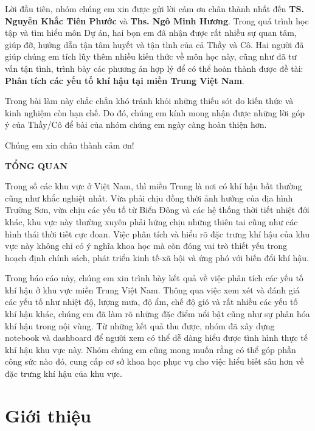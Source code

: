 \documentclass[12pt,a4paper]{article}
\begin{document}
Lời đầu tiên, nhóm chúng em xin được gửi lời cảm ơn chân thành nhất đến \textbf{TS. Nguyễn Khắc Tiên Phước} và \textbf{Ths. Ngô Minh Hương}. Trong quá trình học tập và tìm hiểu môn Dự án, hai bọn em đã nhận được rất nhiều sự quan tâm, giúp đỡ, hướng dẫn tận tâm huyết và tận tình của cả Thầy và Cô. Hai người đã giúp chúng em tích lũy thêm nhiều kiến thức về môn học này, cũng như đã tư vấn tận tình, trình bày các phương án hợp lý để có thể hoàn thành được đề tài: \textbf{Phân tích các yếu tố khí hậu tại miền Trung Việt Nam}.

Trong bài làm này chắc chắn khó tránh khỏi những thiếu sót do kiến thức và kinh nghiệm còn hạn chế. Do đó, chúng em kính mong nhận được những lời góp ý của Thầy/Cô để bài của nhóm chúng em ngày càng hoàn thiện hơn.

Chúng em xin chân thành cảm ơn!

\newpage

\begin{center}
    \textbf{\large TỔNG QUAN}
\end{center}

Trong số các khu vực ở Việt Nam, thì miền Trung là nơi có khí hậu bất thường cũng như khắc nghiệt nhất. Vừa phải chịu đồng thời ảnh hưởng của địa hình Trường Sơn, vừa chịu các yếu tố từ Biển Đông và các hệ thống thời tiết nhiệt đới khác, khu vực này thường xuyên phải hứng chịu những thiên tai cũng như các hình thái thời tiết cực đoan. Việc phân tích và hiểu rõ đặc trưng khí hậu của khu vực này không chỉ có ý nghĩa khoa học mà còn đóng vai trò thiết yếu trong hoạch định chính sách, phát triển kinh tế-xã hội và ứng phó với biến đổi khí hậu.

Trong báo cáo này, chúng em xin trình bày kết quả về việc phân tích các yếu tố khí hậu ở khu vực miền Trung Việt Nam. Thông qua việc xem xét và đánh giá các yếu tố như nhiệt độ, lượng mưa, độ ẩm, chế độ gió và rất nhiều các yếu tố khí hậu khác, chúng em đã làm rõ những đặc điểm nổi bật cũng như sự phân hóa khí hậu trong nội vùng. Từ những kết quả thu được, nhóm đã xây dựng notebook và dashboard để người xem có thể dễ dàng hiểu được tình hình thực tế khí hậu khu vực này. Nhóm chúng em cũng mong muốn rằng có thể góp phần công sức nào đó, cung cấp cơ sở khoa học phục vụ cho việc hiểu biết sâu hơn về đặc trưng khí hậu của khu vực.

\newpage
{}
\tableofcontents
\newpage
\listoffigures
\newpage
\listoftables
\newpage
\section{Giới thiệu}
\end{document}
